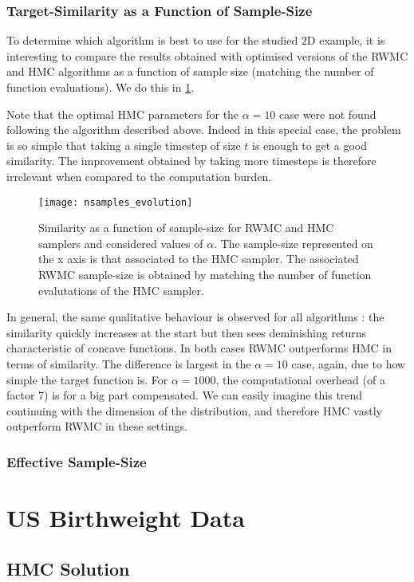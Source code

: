 \documentclass[a4paper, 12pt,oneside]{article}
\begin{document}
		\subsubsection{Target-Similarity as a Function of Sample-Size}
		To determine which algorithm is best to use for the studied 2D example, it is interesting to compare the results obtained with optimised versions of the RWMC and HMC algorithms as a function of sample size (matching the number of function evaluations). We do this in \ref{fig:nsamples-evolution}.

		Note that the optimal HMC parameters for the $\alpha=10$ case were not found following the algorithm described above. Indeed in this special case, the problem is so simple that taking a single timestep of size $t$ is enough to get a good similarity. The improvement obtained by taking more timesteps is therefore irrelevant when compared to the computation burden.
		\begin{figure}[htb]
			\centering
				\vspace{0em}
				\texttt{[image: nsamples\_evolution]}
				\caption{Similarity as a function of sample-size for RWMC and HMC samplers and considered values of $\alpha$. The sample-size represented on the x axis is that associated to the HMC sampler. The associated RWMC sample-size is obtained by matching the number of function evalutations of the HMC sampler.}
				\label{fig:nsamples-evolution}
		\end{figure}
		In general, the same qualitative behaviour is observed for all algorithms : the similarity quickly increases at the start but then sees deminishing returns characteristic of concave functions. In both cases RWMC outperforms HMC in terms of similarity. The difference is largest in the $\alpha=10$ case, again, due to how simple the target function is. For $\alpha=1000$, the computational overhead (of a factor 7) is for a big part compensated. We can easily imagine this trend continuing with the dimension of the distribution, and therefore HMC vastly outperform RWMC in these settings.
		\subsubsection{Effective Sample-Size}
	\section{US Birthweight Data}
		\subsection{HMC Solution}
\end{document}
